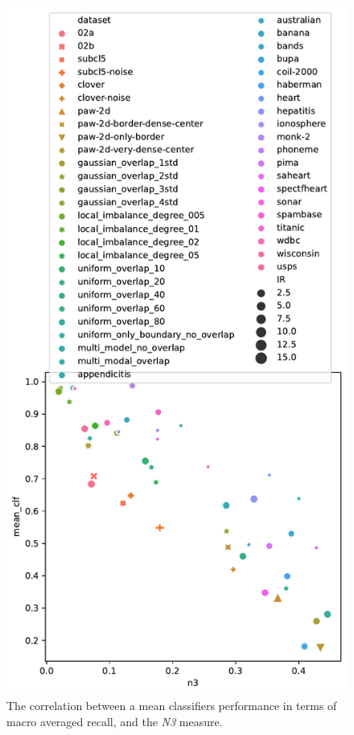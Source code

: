 \begin{figure}[tb]
\centering
\includegraphics[width=0.8\columnwidth]{../plots/dataset_plots/siam_full_plot_n3.pdf}
\caption{The correlation between a mean classifiers performance in terms of macro averaged recall, and the \emph{N3} measure.}
\label{fig:n3_dataset_plot}
\end{figure}
